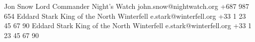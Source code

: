%
%
%


\begin{referees}
		{Jon Snow}
		{Lord Commander}
		{Night's Watch}
		{john.snow@nightwatch.org}
		{+687 987 654}
		{Eddard Stark}
		{King of the North}
		{Winterfell}
		{e.stark@winterfell.org}
		{+33 1 23 45 67 90}
		{Eddard Stark}
		{King of the North}
		{Winterfell}
		{e.stark@winterfell.org}
		{+33 1 23 45 67 90}
\end{referees}